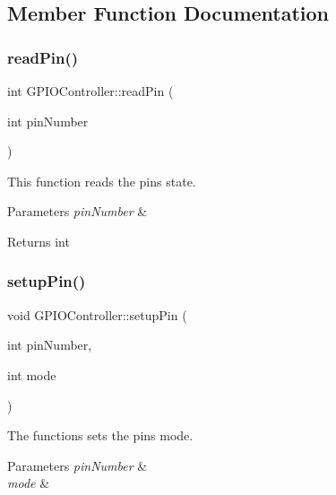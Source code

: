 \subsection{Member Function Documentation}
\mbox{\label{classGPIOController_a90288cf1fa64c2e00e9b7ecfc35dbd54}} 
\subsubsection{\texorpdfstring{read\+Pin()}{readPin()}}
{\footnotesize\ttfamily int G\+P\+I\+O\+Controller\+::read\+Pin (\begin{DoxyParamCaption}\item[{int}]{pin\+Number }\end{DoxyParamCaption})}



This function reads the pin\textquotesingle{}s state. 


\begin{DoxyParams}{Parameters}
{\em pin\+Number} & \\
\hline
\end{DoxyParams}
\begin{DoxyReturn}{Returns}
int 
\end{DoxyReturn}
\mbox{\label{classGPIOController_a3ed1cb3ef1e79636604c9eb24b1eada6}} 
\subsubsection{\texorpdfstring{setup\+Pin()}{setupPin()}}
{\footnotesize\ttfamily void G\+P\+I\+O\+Controller\+::setup\+Pin (\begin{DoxyParamCaption}\item[{int}]{pin\+Number,  }\item[{int}]{mode }\end{DoxyParamCaption})}



The functions sets the pins mode. 


\begin{DoxyParams}{Parameters}
{\em pin\+Number} & \\
\hline
{\em mode} & \\
\hline
\end{DoxyParams}
\mbox{\label{classGPIOController_afec1b6d1415900dc1f99050a471b9f50}} 
